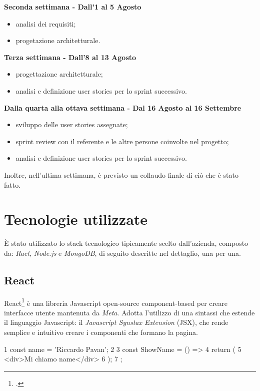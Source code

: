 \noindent\textbf{Seconda settimana - Dall'1 al 5 Agosto}

\begin{itemize}
  \item analisi dei requisiti;
  \item progetazione architetturale.
\end{itemize}

\noindent\textbf{Terza settimana - Dall'8 al 13 Agosto}

\begin{itemize}
  \item progettazione architetturale;
  \item analisi e definizione user stories per lo sprint successivo.
\end{itemize}

\noindent\textbf{Dalla quarta alla ottava settimana - Dal 16 Agosto al 16 Settembre}

\begin{itemize}
  \item sviluppo delle user stories assegnate;
  \item sprint review con il referente e le altre persone coinvolte nel progetto;
  \item analisi e definizione user stories per lo sprint successivo.
\end{itemize}

\noindent Inoltre, nell'ultima settimana, è previsto un collaudo finale di ciò che è stato fatto.

\section{Tecnologie utilizzate}

È stato utilizzato lo stack tecnologico tipicamente scelto dall'azienda, composto da: \emph{Ract}, \emph{Node.js} e \emph{MongoDB}, di seguito descritte nel dettaglio, una per una.

\subsection{React}

React\footcite{site:react} è una libreria Javascript open-source component-based per creare interfacce utente mantenuta da \emph{Meta}. Adotta l'utilizzo di una sintassi che estende il linguaggio Javascript: il \emph{Javascript Synstax Extension} (JSX), che rende semplice e intuitivo creare i componenti che formano la pagina.\\
\begin{code}[frame=tb,title={Esempio di utlizzo di codice JSX}]
1  const name = 'Riccardo Pavan';
2
3  const ShowName = () => {
4    return (
5      <div>Mi chiamo {name}</div>
6    );
7  };

\end{code}

